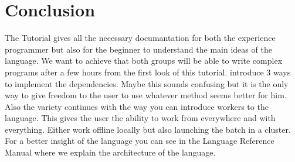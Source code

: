 \section{Conclusion}
\label{sect:conclusion}
The \lang{} Tutorial gives all the necessary documantation for both the experience programmer
but also for the beginner to understand the main ideas of the language. We want to achieve that
both groups will be able to write complex \lang{} programs after a few hours from the first look
of this tutorial. \lang{} introduce 3 ways to implement the dependencies. Maybe this sounds
confusing but it is the only way to give freedom to the user to use whatever method seems
better for him. Also the variety continues with the way you can introduce workers to the language.
This gives the user the ability to work from everywhere and with everything. Either work offline locally
but also launching the batch in a cluster. For a better insight of the \lang{} language you can 
see in the Language Reference Manual where we explain the architecture of the language.
